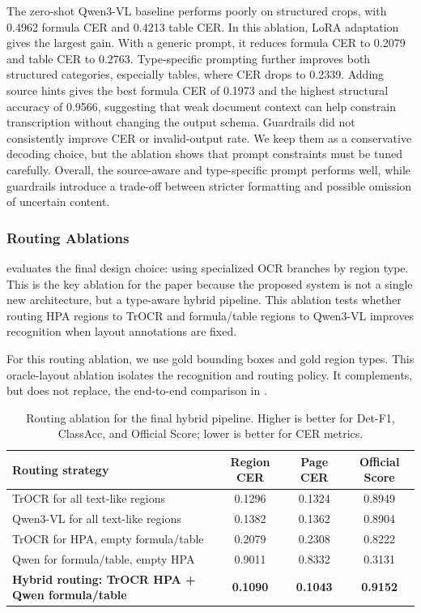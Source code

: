 \documentclass[runningheads]{llncs}
\newcommand{\metrichead}[1]{#1}
\begin{document}
The zero-shot Qwen3-VL baseline performs poorly on structured crops, with 0.4962 formula CER and 0.4213 table CER. In this ablation, LoRA adaptation gives the largest gain. With a generic prompt, it reduces formula CER to 0.2079 and table CER to 0.2763. Type-specific prompting further improves both structured categories, especially tables, where CER drops to 0.2339. Adding source hints gives the best formula CER of 0.1973 and the highest structural accuracy of 0.9566, suggesting that weak document context can help constrain transcription without changing the output schema. Guardrails did not consistently improve CER or invalid-output rate. We keep them as a conservative decoding choice, but the ablation shows that prompt constraints must be tuned carefully. Overall, the source-aware and type-specific prompt performs well, while guardrails introduce a trade-off between stricter formatting and possible omission of uncertain content.

\subsubsection{Routing Ablations}

 evaluates the final design choice: using specialized OCR branches by region type. This is the key ablation for the paper because the proposed system is not a single new architecture, but a type-aware hybrid pipeline. This ablation tests whether routing HPA regions to TrOCR and formula/table regions to Qwen3-VL improves recognition when layout annotations are fixed.

For this routing ablation, we use gold bounding boxes and gold region types. This oracle-layout ablation isolates the recognition and routing policy. It complements, but does not replace, the end-to-end comparison in .

\begin{table}[tb]
  \caption{Routing ablation for the final hybrid pipeline. Higher is better for Det-F1, ClassAcc, and Official Score; lower is better for CER metrics.}
  \label{tab:routing-ablation}
  \centering
  \begingroup
  \footnotesize
  \setlength{\tabcolsep}{3pt}
  \renewcommand{\arraystretch}{1.05}
  \begin{tabularx}{\linewidth}{@{}Yccc@{}}
    \toprule
    Routing strategy & \metrichead{Region CER} & \metrichead{Page CER} & \metrichead{Official Score} \\
    \midrule
    TrOCR for all text-like regions & 0.1296 & 0.1324 & 0.8949 \\
    Qwen3-VL for all text-like regions & 0.1382 & 0.1362 & 0.8904 \\
    TrOCR for HPA, empty formula/table & 0.2079 & 0.2308 & 0.8222 \\
    Qwen for formula/table, empty HPA & 0.9011 & 0.8332 & 0.3131 \\
    \textbf{Hybrid routing: TrOCR HPA + Qwen formula/table} & \textbf{0.1090} & \textbf{0.1043} & \textbf{0.9152} \\
    \bottomrule
  \end{tabularx}
  \endgroup
\end{table}
\end{document}
